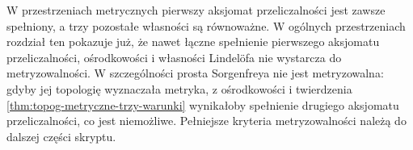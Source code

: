 \begin{uwaga}
\label{rem:topog-przeliczalnosc-metryzowalnosc}
W przestrzeniach metrycznych pierwszy aksjomat przeliczalności
jest zawsze spełniony, a trzy pozostałe własności są równoważne.
W ogólnych przestrzeniach rozdział ten pokazuje już,
że nawet łączne spełnienie pierwszego aksjomatu przeliczalności,
ośrodkowości i własności Lindelöfa nie wystarcza do
metryzowalności. W szczególności prosta Sorgenfreya
nie jest metryzowalna: gdyby jej topologię wyznaczała
metryka, z ośrodkowości i twierdzenia
\ref{thm:topog-metryczne-trzy-warunki}
wynikałoby spełnienie drugiego aksjomatu przeliczalności,
co jest niemożliwe.
Pełniejsze kryteria metryzowalności należą do dalszej
części skryptu.
\end{uwaga}
\FloatBarrier
